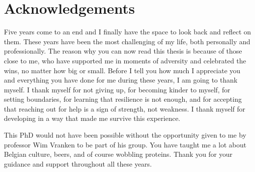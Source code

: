 \chapter*{Acknowledgements}

Five years come to an end and I finally have the space to look back and reflect on them. These years have been the most challenging of my life, both personally and professionally. The reason why you can now read this thesis is because of those close to me, who have supported me in moments of adversity and celebrated the wins, no matter how big or small. Before I tell you how much I appreciate you and everything you have done for me during these years, I am going to thank myself. I thank myself for not giving up, for becoming kinder to myself, for setting boundaries, for learning that resilience is not enough, and for accepting that reaching out for help is a sign of strength, not weakness. I thank myself for developing in a way that made me survive this experience. 

This PhD would not have been possible without the opportunity given to me by professor Wim Vranken to be part of his group. You have taught me a lot about Belgian culture, beers, and of course wobbling proteins. Thank you for your guidance and support throughout all these years.

